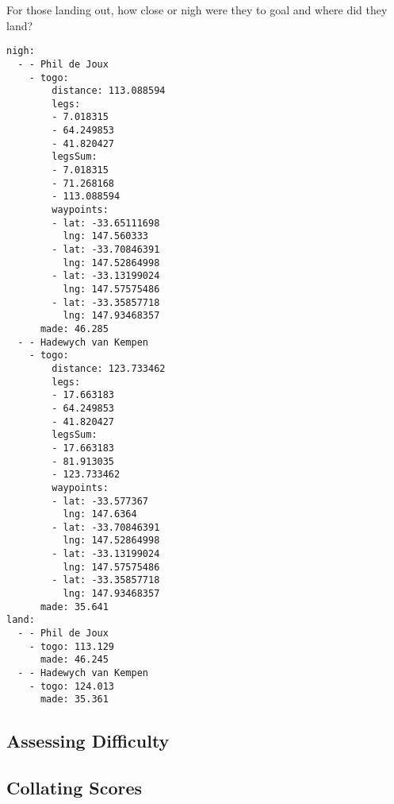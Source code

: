 \documentclass[gap.tex]{subfiles}
\begin{document}
\newpage
For those landing out, how close or nigh were they to goal and where did they land?

\begin{lstlisting}[caption={Collated items of \texttt{*.mask-track.yaml}}]
nigh:
  - - Phil de Joux
    - togo:
        distance: 113.088594
        legs:
        - 7.018315
        - 64.249853
        - 41.820427
        legsSum:
        - 7.018315
        - 71.268168
        - 113.088594
        waypoints:
        - lat: -33.65111698
          lng: 147.560333
        - lat: -33.70846391
          lng: 147.52864998
        - lat: -33.13199024
          lng: 147.57575486
        - lat: -33.35857718
          lng: 147.93468357
      made: 46.285
  - - Hadewych van Kempen
    - togo:
        distance: 123.733462
        legs:
        - 17.663183
        - 64.249853
        - 41.820427
        legsSum:
        - 17.663183
        - 81.913035
        - 123.733462
        waypoints:
        - lat: -33.577367
          lng: 147.6364
        - lat: -33.70846391
          lng: 147.52864998
        - lat: -33.13199024
          lng: 147.57575486
        - lat: -33.35857718
          lng: 147.93468357
      made: 35.641
land:
  - - Phil de Joux
    - togo: 113.129
      made: 46.245
  - - Hadewych van Kempen
    - togo: 124.013
      made: 35.361
\end{lstlisting}

\subsection{Assessing Difficulty}
\subsection{Collating Scores}
\end{document}
